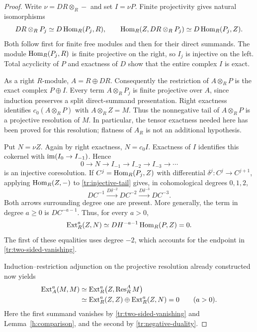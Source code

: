 \begin{proof}
Write $\nu=DR\otimes_R-$ and set $I=\nu P$.  Finite projectivity gives
natural isomorphisms
\begin{equation}\label{tr:nakayama-evaluation}
 DR\otimes_R P_j\simeq D\operatorname{Hom}_R(P_j,R),
 \qquad
 \operatorname{Hom}_R(Z,DR\otimes_R P_j)\simeq D\operatorname{Hom}_R(P_j,Z).
\end{equation}
Both follow first for finite free modules and then for their direct
summands.  The module $\operatorname{Hom}_R(P_j,R)$ is finite projective on the right,
so $I_j$ is injective on the left.  Total acyclicity of $P$ and exactness
of $D$ show that the entire complex $I$ is exact.

As a right $R$-module, $A=R\oplus DR$.  Consequently the restriction of
$A\otimes_RP$ is the exact complex $P\oplus I$.  Every term
$A\otimes_RP_j$ is finite projective over $A$, since induction preserves
a split direct-summand presentation.  Right exactness identifies
$c_0(A\otimes_RP)$ with $A\otimes_RZ=M$.  Thus the nonnegative tail of
$A\otimes_RP$ is a projective resolution of $M$.  In particular, the
tensor exactness needed here has been proved for this resolution;
flatness of $A_R$ is not an additional hypothesis.

Put $N=\nu Z$.  Again by right exactness, $N=c_0I$.  Exactness of $I$
identifies this cokernel with $\operatorname{im}(I_0\to I_{-1})$.  Hence
\begin{equation}\label{tr:injective-tail}
 0\longrightarrow N\longrightarrow I_{-1}
 \longrightarrow I_{-2}\longrightarrow I_{-3}\longrightarrow\cdots
\end{equation}
is an injective coresolution.  If $C^j=\operatorname{Hom}_R(P_j,Z)$ with differential
$\delta^j:C^j\to C^{j+1}$, applying $\operatorname{Hom}_R(Z,-)$ to
\eqref{tr:injective-tail} gives, in cohomological degrees $0,1,2$,
\[
 DC^{-1}\xrightarrow{D\delta^{-2}}DC^{-2}
 \xrightarrow{D\delta^{-3}}DC^{-3}.
\]
Both arrows surrounding degree one are present.  More generally, the
term in degree $a\geq0$ is $DC^{-a-1}$.  Thus, for every $a>0$,
\begin{equation}\label{tr:negative-duality}
 \operatorname{Ext}_R^a(Z,N)\simeq D H^{-a-1}\operatorname{Hom}_R(P,Z)=0.
\end{equation}
The first of these equalities uses degree $-2$, which accounts for the
endpoint in \eqref{tr:two-sided-vanishing}.

Induction--restriction adjunction on the projective resolution already
constructed now yields
\begin{align*}
 \operatorname{Ext}_A^a(M,M)
 &\simeq \operatorname{Ext}_R^a\bigl(Z,\operatorname{Res}_R^A M\bigr)\\
 &\simeq \operatorname{Ext}_R^a(Z,Z)\oplus\operatorname{Ext}_R^a(Z,N)=0
 \qquad(a>0).
\end{align*}
Here the first summand vanishes by
\eqref{tr:two-sided-vanishing} and Lemma~\ref{h:comparison}, and the
second by \eqref{tr:negative-duality}.


\end{proof}
